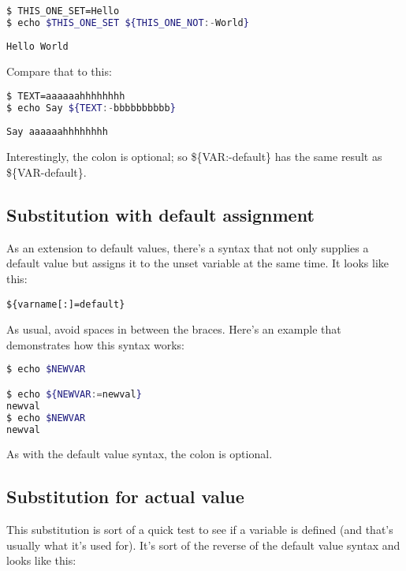 \lstset{basicstyle=\scriptsize, numbers=left, captionpos=b, tabsize=4}
\begin{lstlisting}[caption=Default values,language={bash},
breaklines=true,xleftmargin=15pt,label=lst:Default values]
$ THIS_ONE_SET=Hello
$ echo $THIS_ONE_SET ${THIS_ONE_NOT:-World}
\end{lstlisting}

\scriptsize
\begin{verbatim}
Hello World
\end{verbatim}
\normalsize

Compare that to this:
\lstset{basicstyle=\scriptsize, numbers=left, captionpos=b, tabsize=4}
\begin{lstlisting}[caption=Default not needed,language={bash},
breaklines=true,xleftmargin=15pt,label=lst:Default not needed]
$ TEXT=aaaaaahhhhhhhh
$ echo Say ${TEXT:-bbbbbbbbbb}
\end{lstlisting}

\scriptsize
\begin{verbatim}
Say aaaaaahhhhhhhh
\end{verbatim}
\normalsize

Interestingly, the colon is optional; so \$\{VAR:-default\} has the same result
as \$\{VAR-default\}.

\subsection{Substitution with default assignment}
As an extension to default values, there's a syntax that not only supplies a
default value but assigns it to the unset variable at the same time. It looks
like this:
\begin{verbatim}
${varname[:]=default}
\end{verbatim}
\normalsize

As usual, avoid spaces in between the braces. Here's an example that
demonstrates how this syntax works:


\lstset{basicstyle=\scriptsize, numbers=left, captionpos=b, tabsize=4}
\begin{lstlisting}[caption=Default value assignment,language={bash},
breaklines=true,xleftmargin=15pt,label=lst:Default value assignment]
$ echo $NEWVAR

$ echo ${NEWVAR:=newval}
newval
$ echo $NEWVAR
newval
\end{lstlisting}

As with the default value syntax, the colon is optional.

\subsection{Substitution for actual value}
This substitution is sort of a quick test to see if a variable is defined (and
that's usually what it's used for). It's sort of the reverse of the default
value syntax and looks like this:

